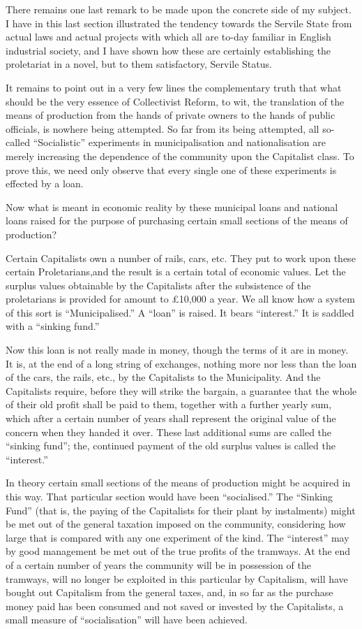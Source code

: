 \documentclass{book}
\begin{document}
There remains one last remark to be made upon the concrete side of my subject. I have in this last section illustrated the tendency towards the Servile State from actual laws and actual projects with which all are to-day familiar in English industrial society, and I have shown how these are certainly establishing the proletariat in a novel, but to them satisfactory, Servile Status.

It remains to point out in a very few lines the complementary truth that what should be the very essence of Collectivist Reform, to wit, the translation of the means of production from the hands of private owners to the hands of public officials, is nowhere being attempted. So far from its being attempted, all so-called “Socialistic” experiments in municipalisation and nationalisation are merely increasing the dependence of the community upon the Capitalist class. To prove this, we need only observe that every single one of these experiments is effected by a loan.

Now what is meant in economic reality by these municipal loans and national loans raised for the purpose of purchasing certain small sections of the means of production?

Certain Capitalists own a number of rails, cars, etc. They put to work upon these certain Proletarians,and the result is a certain total of economic values. Let the surplus values obtainable by the Capitalists after the subsistence of the proletarians is provided for amount to £10,000 a year. We all know how a system of this sort is “Municipalised.” A “loan” is raised. It bears “interest.” It is saddled with a “sinking fund.”

Now this loan is not really made in money, though the terms of it are in money. It is, at the end of a long string of exchanges, nothing more nor less than the loan of the cars, the rails, etc., by the Capitalists to the Municipality. And the Capitalists require, before they will strike the bargain, a guarantee that the whole of their old profit shall be paid to them, together with a further yearly sum, which after a certain number of years shall represent the original value of the concern when they handed it over. These last additional sums are called the “sinking fund”; the, continued payment of the old surplus values is called the “interest.”

In theory certain small sections of the means of production might be acquired in this way. That particular section would have been “socialised.” The “Sinking Fund” (that is, the paying of the Capitalists for their plant by instalments) might be met out of the general taxation imposed on the community, considering how large that is compared with any one experiment of the kind. The “interest” may by good management be met out of the true profits of the tramways. At the end of a certain number of years the community will be in possession of the tramways, will no longer be exploited in this particular by Capitalism, will have bought out Capitalism from the general taxes, and, in so far as the purchase money paid has been consumed and not saved or invested by the Capitalists, a small measure of “socialisation” will have been achieved.
\end{document}
